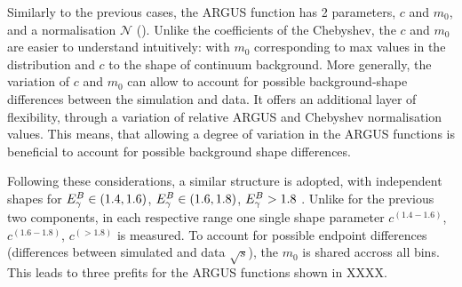 Similarly to the previous cases, the ARGUS function has 2 parameters, $c$ and $m_0$, and a normalisation $\mathcal{N}$ ().
Unlike the coefficients of the Chebyshev, the $c$ and $m_0$ are easier to understand intuitively: with $m_0$ corresponding to max \Mbc values in the distribution and $c$ to the shape of continuum background.
More generally, the variation of $c$ and $m_0$ can allow to account for possible background-shape differences between the simulation and data.
It offers an additional layer of flexibility, through a variation of relative ARGUS and Chebyshev normalisation values.
This means, that allowing a degree of variation in the ARGUS functions is beneficial to account for possible background shape differences.

Following these considerations, a similar structure is adopted, with independent shapes for  ${E^B_{\gamma}}\in(1.4,1.6)$, ${E^B_{\gamma}}\in(1.6,1.8)$, ${E^B_{\gamma}}>1.8$ \gev.
Unlike for the previous two components, in each respective range one single shape parameter $c^{(1.4-1.6)}$, $c^{(1.6-1.8)}$, $c^{(>1.8)}$ is measured.
To account for possible endpoint differences (differences between simulated and data $\sqrt{s}$), the $m_0$ is shared accross all bins.
This leads to three prefits for the ARGUS functions shown in XXXX.
